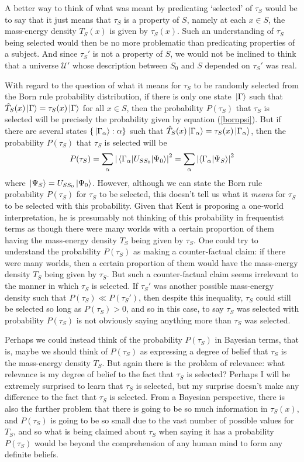 A better way to think of what was meant by predicating `selected' of $\tau_S$ would be to say that it just means that $\tau_S$ is a property of $S$, namely at each $x\in S$, the mass-energy density $T_S(x)$ is given by $\tau_S(x)$. Such an understanding of $\tau_S$ being selected would then be no more problematic than predicating properties of a subject. And since $\tau_S'$ is not a property of $S$, we would not be inclined to think that a universe $\mathcal{U}'$  whose description between $S_0$ and $S$ depended on $\tau_S'$ was real. 

With regard to the question of what it means for $\tau_S$ to be randomly selected from the Born rule probability distribution, if there is only one state $\ket*{\Gamma}$ such that $\hat{T}_S(x)\ket*{\Gamma}=\tau_S(x)\ket*{\Gamma}$ for all $x\in S$, then the probability $P(\tau_S)$ that $\tau_S$ is selected will be precisely the probability given by equation (\ref{bornpsi}). But if there are several states $\{\ket*{\Gamma_\alpha}:\alpha\}$ such that  $\hat{T}_S(x)\ket*{\Gamma_\alpha}=\tau_S(x)\ket*{\Gamma_\alpha}$, then the probability $P(\tau_S)$ that $\tau_S$ is selected will be 
$$P(\tau_S)=\sum_\alpha \abs{\mel{\Gamma_\alpha}{U_{SS_0}}{\Psi_0}}^2=\sum_\alpha \abs{\ip{\Gamma_\alpha}{\Psi_S}}^2$$ 
where $\ket*{\Psi_S}=U_{SS_0}\ket*{\Psi_0}$. However, although we can state the Born rule probability $P(\tau_S)$ for $\tau_S$ to be selected, this doesn't tell us what it \emph{means} for $\tau_S$ to be selected with this probability. Given that Kent is proposing a one-world interpretation, he is presumably not thinking of this probability in frequentist terms as though there were many worlds with a certain proportion of them having the mass-energy density $T_S$ being given by $\tau_S$. One could try to understand the probability $P(\tau_S)$ as making a counter-factual claim: if there were many worlds, then a certain proportion of them would have the mass-energy density $T_S$ being given by $\tau_S$. But such a counter-factual claim seems irrelevant to the manner in which $\tau_S$ is selected. If $\tau_S'$ was another possible mass-energy density such that $P(\tau_S)\ll P(\tau_S')$,  then despite this inequality, $\tau_S$ could still be selected so long as $P(\tau_S)>0$, and so in this case, to say $\tau_S$ was selected with probability $P(\tau_S)$ is not obviously saying anything more than  $\tau_S$ was selected.

Perhaps we could instead think of the probability $P(\tau_S)$ in Bayesian terms, that is, maybe we should think of $P(\tau_S)$ as expressing a degree of belief that $\tau_S$ is the mass-energy density $T_S$. But again there is the problem of relevance: what relevance is my degree of belief to the fact that $\tau_S$ is selected? Perhaps I will be extremely surprised to learn that $\tau_S$ is selected, but my surprise doesn't make any difference to the fact that $\tau_S$ is selected. From a Bayesian perspective, there is also the further problem that there is going to be so much information in $\tau_S(x)$, and $P(\tau_S)$ is going to be so small due to the vast number of possible values for $T_S$, and so what is being claimed about $\tau_S$ when saying it has a probability $P(\tau_S)$ would be beyond the comprehension of any human mind to form any definite beliefs. 

